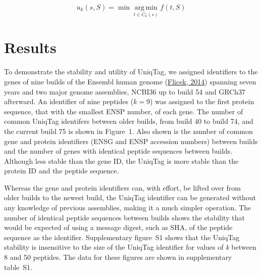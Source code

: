 \documentclass{bioinfo}
\begin{document}
\[
u_k(s, S) = \min \mathop{\arg\,\min}\limits_{t \in C_k(s)} f(t, S)
\]

\section{Results}\label{results}

To demonstrate the stability and utility of UniqTag, we assigned
identifiers to the genes of nine builds of the Ensembl human genome
(\href{http://dx.doi.org/10.1093/nar/gkt1196}{Flicek, 2014}) spanning
seven years and two major genome assemblies, NCBI36 up to build 54 and
GRCh37 afterward. An identifier of nine peptides ($k=9$) was assigned to
the first protein sequence, that with the smallest ENSP number, of each
gene. The number of common UniqTag identifers between older builds, from
build 40 to build 74, and the current build 75 is shown in Figure~1.
Also shown is the number of common gene and protein identifiers (ENSG
and ENSP accession numbers) between builds and the number of genes with
identical peptide sequences between builds. Although less stable than
the gene ID, the UniqTag is more stable than the protein ID and the
peptide sequence.

Whereas the gene and protein identifiers can, with effort, be lifted
over from older builds to the newest build, the UniqTag identifier can
be generated without any knowledge of previous assemblies, making it a
much simpler operation. The number of identical peptide sequences
between builds shows the stability that would be expected of using a
message digest, such as SHA, of the peptide sequence as the identifier.
Supplementary figure~S1 shows that the UniqTag stability is insensitive
to the size of the UniqTag identifier for values of \emph{k} between 8
and 50 peptides. The data for these figures are shown in supplementary
table~S1.
\end{document}
